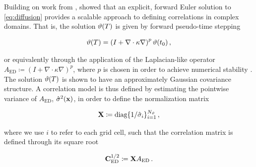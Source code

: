 Building on work from \citet{derber_global_1989, egbert_topexposeidon_1994,
bennett_generalized_1996},
\citet{weaver_correlation_2001} showed that an explicit, forward Euler solution to
\cref{eq:diffusion} provides a scalable approach to defining correlations in
complex domains.
That is, the solution $\vartheta(T)$ is given by forward pseudo-time stepping
\begin{linenomath*}\begin{equation}
    \vartheta(T) = \left( I + \nabla\cdot\kappa\nabla\right)^p \vartheta(t_0) \, ,
    \label{eq:wc01_diffusion}
\end{equation}\end{linenomath*}
or equivalently through the application of the Laplacian-like operator
$A_\text{ED} \coloneqq \left(I+\nabla\cdot\kappa\nabla\right)^p$, where $p$ is chosen in
order to achieve numerical stability \citep[see][for details regarding the
discretized form of this operator, and extensions of the model briefly shown
here]{weaver_correlation_2001}.
The solution $\vartheta(T)$ is shown to have an approximately Gaussian covariance
structure.
A correlation model is thus defined by estimating the pointwise
variance of $A_\text{ED}$, $\hat{\sigma}^2(\mathbf{x})$, in order to define the normalization
matrix
\begin{linenomath*}\begin{equation*}
    \mathbf{X} \coloneqq \text{diag}\{1/\hat{\sigma}_i\}_{i=1}^{N_{\vartheta}} \, ,
\end{equation*}\end{linenomath*}
where we use $i$ to refer to each grid cell, such that the correlation matrix is
defined through its square root
\begin{linenomath*}\begin{equation}
    \mathbf{C}^{1/2}_\text{ED} \coloneqq \mathbf{X} A_\text{ED} \, .
\end{equation}\end{linenomath*}

